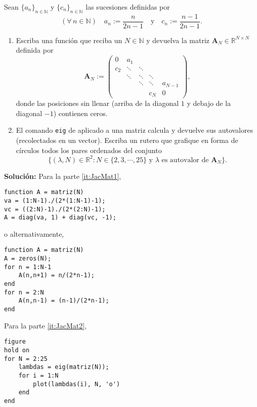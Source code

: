 Sean $\{a_n\}_{n \in \mathbb{N}}$ y $\{c_n\}_{n \in \mathbb{N}}$ las sucesiones definidas por
%
\begin{equation*}
(\forall\,n\in\mathbb{N}) \quad a_n := \frac{n}{2n-1} \quad\text{y}\quad c_n := \frac{n-1}{2n-1}.
\end{equation*}
%
\begin{enumerate}
\item\label{it:JacMat1} Escriba una funci\'on \matlab que reciba un $N \in \mathbb{N}$ y devuelva la matriz $\boldsymbol{A}_N \in \mathbb{R}^{N \times N}$ definida por
%
\begin{equation*}
\boldsymbol{A}_N := \begin{pmatrix}
0 &a_1&&&\\
c_2&\ddots&\ddots&&\\
&\ddots&\ddots&\ddots&\\
&&\ddots &\ddots& a_{N-1}\\\
&&&c_N& 0
\end{pmatrix},
\end{equation*}
%
donde las posiciones sin llenar (arriba de la diagonal $1$ y debajo de la diagonal $-1$) contienen ceros.
\item\label{it:JacMat2} El comando \texttt{eig} de \matlab aplicado a una matriz calcula y devuelve sus autovalores (recolectados en un vector).
Escriba un rutero que grafique en forma de c\'irculos todos los pares ordenados del conjunto
%
\begin{equation*}
\{(\lambda, N)\in\mathbb{R}^2: N\in\{2,3,\cdots,25\} \text{ y } \lambda \text{ es autovalor de } \boldsymbol{A}_N \}.
\end{equation*}
%
\end{enumerate}

\textbf{Soluci\'on:} Para la parte \ref{it:JacMat1},
\begin{lstlisting}
function A = matriz(N)
va = (1:N-1)./(2*(1:N-1)-1);
vc = ((2:N)-1)./(2*(2:N)-1);
A = diag(va, 1) + diag(vc, -1);
\end{lstlisting}
o alternativamente,
\begin{lstlisting}
function A = matriz(N)
A = zeros(N);
for n = 1:N-1
    A(n,n+1) = n/(2*n-1);
end
for n = 2:N
    A(n,n-1) = (n-1)/(2*n-1);
end
\end{lstlisting}
\hfill{}



Para la parte \ref{it:JacMat2},
\begin{lstlisting}
figure
hold on
for N = 2:25
    lambdas = eig(matriz(N));
    for i = 1:N
        plot(lambdas(i), N, 'o')
    end
end
\end{lstlisting}
\hfill{}

